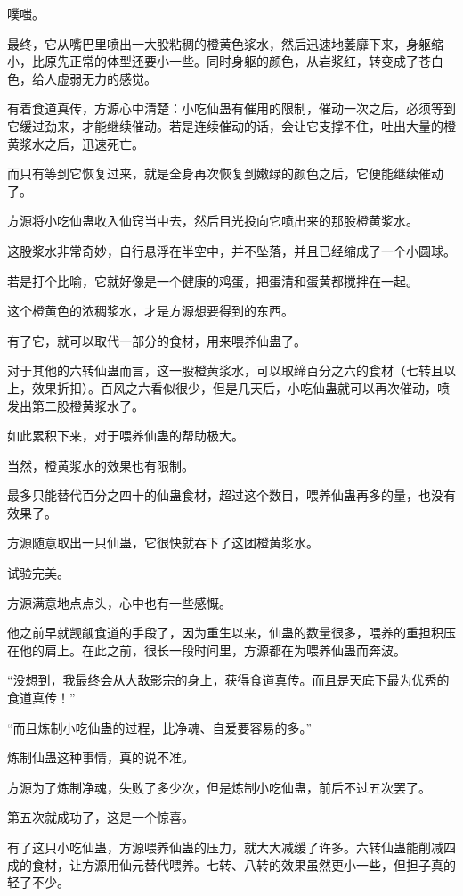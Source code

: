 \begin{this_body}
噗嗤。

最终，它从嘴巴里喷出一大股粘稠的橙黄色浆水，然后迅速地萎靡下来，身躯缩小，比原先正常的体型还要小一些。同时身躯的颜色，从岩浆红，转变成了苍白色，给人虚弱无力的感觉。

有着食道真传，方源心中清楚：小吃仙蛊有催用的限制，催动一次之后，必须等到它缓过劲来，才能继续催动。若是连续催动的话，会让它支撑不住，吐出大量的橙黄浆水之后，迅速死亡。

而只有等到它恢复过来，就是全身再次恢复到嫩绿的颜色之后，它便能继续催动了。

方源将小吃仙蛊收入仙窍当中去，然后目光投向它喷出来的那股橙黄浆水。

这股浆水非常奇妙，自行悬浮在半空中，并不坠落，并且已经缩成了一个小圆球。

若是打个比喻，它就好像是一个健康的鸡蛋，把蛋清和蛋黄都搅拌在一起。

这个橙黄色的浓稠浆水，才是方源想要得到的东西。

有了它，就可以取代一部分的食材，用来喂养仙蛊了。

对于其他的六转仙蛊而言，这一股橙黄浆水，可以取缔百分之六的食材（七转且以上，效果折扣）。百风之六看似很少，但是几天后，小吃仙蛊就可以再次催动，喷发出第二股橙黄浆水了。

如此累积下来，对于喂养仙蛊的帮助极大。

当然，橙黄浆水的效果也有限制。

最多只能替代百分之四十的仙蛊食材，超过这个数目，喂养仙蛊再多的量，也没有效果了。

方源随意取出一只仙蛊，它很快就吞下了这团橙黄浆水。

试验完美。

方源满意地点点头，心中也有一些感慨。

他之前早就觊觎食道的手段了，因为重生以来，仙蛊的数量很多，喂养的重担积压在他的肩上。在此之前，很长一段时间里，方源都在为喂养仙蛊而奔波。

“没想到，我最终会从大敌影宗的身上，获得食道真传。而且是天底下最为优秀的食道真传！”

“而且炼制小吃仙蛊的过程，比净魂、自爱要容易的多。”

炼制仙蛊这种事情，真的说不准。

方源为了炼制净魂，失败了多少次，但是炼制小吃仙蛊，前后不过五次罢了。

第五次就成功了，这是一个惊喜。

有了这只小吃仙蛊，方源喂养仙蛊的压力，就大大减缓了许多。六转仙蛊能削减四成的食材，让方源用仙元替代喂养。七转、八转的效果虽然更小一些，但担子真的轻了不少。


\end{this_body}
